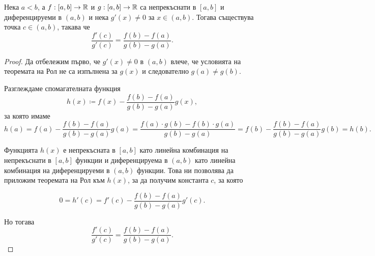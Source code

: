 \documentclass[numbers=endperiod, DIV=15, bibliography=totocnumbered]{scrartcl}
\begin{document}
\begin{theorem}
  Нека $a < b$, а $f: [a, b] \to \mathbb{R}$ и $g: [a, b] \to \mathbb{R}$ са непрекъснати в $[a, b]$ и диференцируеми в $(a, b)$ и нека $g'(x) \neq 0$ за $x \in (a, b)$. Тогава съществува точка $c \in (a, b)$, такава че
  \begin{displaymath}
    \frac {f'(c)} {g'(c)} = \frac {f(b) - f(a)} {g(b) - g(a)}.
  \end{displaymath}
\end{theorem}
\begin{proof}
  Да отбележим първо, че $g'(x) \neq 0$ в $(a, b)$ влече, че условията на теоремата на Рол не са изпълнена за $g(x)$ и следователно $g(a) \neq g(b)$.

  Разглеждаме спомагателната функция
  \begin{displaymath}
    h(x) \coloneqq f(x) - \frac {f(b) - f(a)} {g(b) - g(a)} g(x),
  \end{displaymath}
  за която имаме
  \begin{displaymath}
    h(a)
    =
    f(a) - \frac {f(b) - f(a)} {g(b) - g(a)} g(a)
    =
    \frac {f(a) \cdot g(b) - f(b) \cdot g(a)} {g(b)-g(a)}
    =
    f(b) - \frac {f(b) - f(a)} {g(b) - g(a)} g(b)
    =
    h(b).
  \end{displaymath}

  Функцията $h(x)$ е непрекъсната в $[a, b]$ като линейна комбинация на непрекъснати в $[a, b]$ функции и диференцируема в $(a, b)$ като линейна комбинация на диференцируеми в $(a, b)$ функции. Това ни позволява да приложим теоремата на Рол към $h(x)$, за да получим константа $c$, за която

  \begin{displaymath}
    0 = h'(c) = f'(c) - \frac {f(b) - f(a)} {g(b) - g(a)} g'(c).
  \end{displaymath}

  Но тогава
  \begin{displaymath}
    \frac {f'(c)} {g'(c)} = \frac {f(b) - f(a)} {g(b) - g(a)}.
  \end{displaymath}
\end{proof}

\printbibliography
\end{document}
